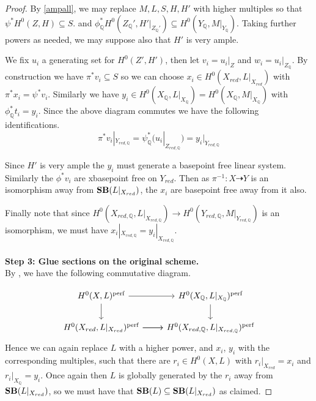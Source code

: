 \begin{proof}
	By \autoref{ampall}, we may replace $M,L,S,H,H'$ with higher multiples so that $\psi^{*}H^{0}(Z,H)\subseteq S$. and $\phi_{\mathbb{Q}}^{*}H^{0}(Z_{\mathbb{Q}}',H'|_{Z_{\mathbb{Q}}'})\subseteq H^{0}(Y_{\mathbb{Q}},M|_{Y_{\mathbb{Q}}})$. 
	Taking further powers as needed, we may suppose also that $H'$ is very ample.
	
	We fix $u_{i}$ a generating set for $H^{0}(Z',H')$, then let $v_{i}=u_{i}|_{Z}$ and $w_{i}=u_{i}|_{Z_\mathbb{Q}}$. By construction we have $\pi^{*}v_{i}\subseteq S$ so we can choose $x_{i}\in H^{0}(X_{red},L|_{X_{red}})$ with $\pi^{*}x_{i}=\psi^{*}v_{i}$. Similarly we have $y_{i} \in H^{0}(X_{\mathbb{Q}},L|_{X_{\mathbb{Q}}})=H^{0}(X_{\mathbb{Q}},M|_{X_{\mathbb{Q}}})$ with $\phi_{\mathbb{Q}}^{*}t_{i}=y_{i}$. Since the above diagram commutes we have the following identifications. $$\pi^{*}v_{i}|_{Y_{red,\mathbb{Q}}}=\psi_{\mathbb{Q}}^{*}(u_{i}|_{Z_{red,\mathbb{Q}}})=y_{i}|_{Y_{red,\mathbb{Q}}}$$
	
	Since $H'$ is very ample the $y_{i}$ must generate a basepoint free linear system. Similarly the $\phi^{*}v_{i}$ are xbasepoint free on $Y_{red}$. Then as $\pi^{-1}\colon X \dashrightarrow Y$ is an isomorphism away from $\mathbf{SB}(L|_{X_{red}})$, the $x_{i}$ are basepoint free away from it also.
	
	Finally note that since $H^{0}(X_{red,\mathbb{Q}},L|_{X_{red,\mathbb{Q}}}) \to H^{0}(Y_{red,\mathbb{Q}},M|_{Y_{red,\mathbb{Q}}})$ is an isomorphism, we must have $x_{i}|_{X_{red,\mathbb{Q}}}=y_{i}|_{X_{red,\mathbb{Q}}}$.\\
	\\
	\textbf{Step 3: Glue sections on the original scheme.}\\
	
	By \cite[Proposition 3.5]{witaszek2020keel}, we have the following commutative diagram. 
	
	\[
	\begin{tikzcd}
	{H^{0}(X,L)^{\perf}} \arrow[d] \arrow[r]                 & {H^{0}(X_{\mathbb{Q}},L|_{X_{\mathbb{Q}}})^{\perf}} \arrow[d] \\
	{H^{0}(X_{red},L|_{X_{red}})^{\perf}} \arrow[r] \arrow[r] & {H^{0}(X_{red,\mathbb{Q}},L|_{X_{red,\mathbb{Q}}})^{\perf}}  
	\end{tikzcd}	
	\]
	Hence we can again replace $L$ with a higher power, and $x_{i}$, $y_{i}$ with the corresponding multiples, such that there are $r_{i} \in H^{0}(X,L)$ with $r_{i}|_{X_{red}}=x_{i}$ and $r_{i}|_{X_{\mathbb{Q}}}=y_{i}$. Once again then $L$ is globally generated by the $r_{i}$ away from $\mathbf{SB}(L|_{X_{red}})$, so we must have that $\mathbf{SB}(L)\subseteq \mathbf{SB}(L|_{X_{red}})$ as claimed.
\end{proof}


